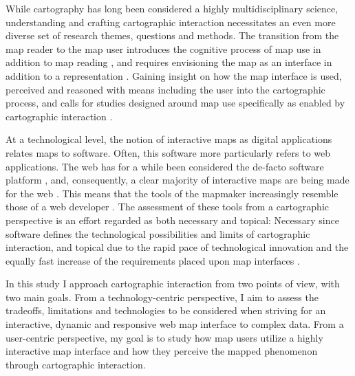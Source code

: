 While cartography has long been considered a highly multidisciplinary science,
understanding and crafting cartographic interaction necessitates an even
more diverse set of research themes, questions and methods.
The transition from the map reader to the map user
introduces the cognitive process of map use in addition to map reading
\parencite{mac2015, liu2010},
and requires envisioning the map as an interface in addition to a representation
\parencite{rot2013b}.
Gaining insight on how the map interface is used, perceived and reasoned with
means including the user into the cartographic process,
and calls for studies designed around map use specifically as enabled by cartographic interaction
\parencite{rot2017}.

At a technological level,
the notion of interactive maps as digital applications relates maps to software.
Often, this software more particularly refers to web applications.
The web has for a while been considered the de-facto software platform \parencite{tai2017, mik2019},
and, consequently,
a clear majority of interactive maps are being made for the web \parencite{vee2017}.
This means that the tools of the mapmaker
increasingly resemble those of a web developer \parencite{rot2021}.
The assessment of these tools from a cartographic perspective is
an effort regarded as both necessary and topical:
Necessary since software defines the technological possibilities and limits
of cartographic interaction,
and topical due to the rapid pace of technological innovation
and the equally fast increase of the requirements placed upon map interfaces
\parencite{rot2014, rot2021}.

In this study I approach cartographic interaction from two points of view,
with two main goals.
From a technology-centric perspective,
I aim to assess the tradeoffs, limitations and technologies to be considered when
striving for an interactive, dynamic and responsive web map interface to complex data.
From a user-centric perspective,
my goal is to study how
map users utilize a highly interactive map interface
and how they perceive the mapped phenomenon
through cartographic interaction.



